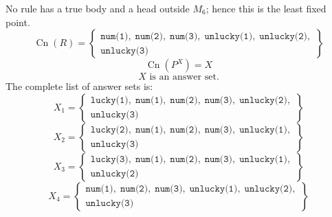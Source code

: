\documentclass[a4paper,11pt]{article}
\newif\ifexplain
\newcommand{\explain}[1]{\ifexplain\begin{erklbox}#1\end{erklbox}\fi}
\newcommand{\at}[1]{\texttt{#1}}
\begin{document}
\explain{Für $\at{unlucky(3)}$ brauchen wir $\at{num(3)}$. Weil diese Voraussetzungen bereits hergeleitet sind, dürfen wir den Regelkopf jetzt aufnehmen und alle bisherigen Atome behalten; bei einer fehlenden Voraussetzung würde diese Regel dagegen noch nichts beitragen.}
No rule has a true body and a head outside $M_{6}$; hence this is the least fixed point.
\[
\operatorname{Cn}(R)=\left\{\begin{gathered}\at{num(1)},\;\at{num(2)},\;\at{num(3)},\;\at{unlucky(1)},\;\at{unlucky(2)},\\\at{unlucky(3)}\end{gathered}\right\}
\]
\[
\operatorname{Cn}(P^X)=X
\]
\[
\boxed{X\text{ is an answer set.}}
\]
The complete list of answer sets is:
\[
\boxed{X_1=\left\{\begin{gathered}\at{lucky(1)},\;\at{num(1)},\;\at{num(2)},\;\at{num(3)},\;\at{unlucky(2)},\\\at{unlucky(3)}\end{gathered}\right\}}
\]
\[
\boxed{X_2=\left\{\begin{gathered}\at{lucky(2)},\;\at{num(1)},\;\at{num(2)},\;\at{num(3)},\;\at{unlucky(1)},\\\at{unlucky(3)}\end{gathered}\right\}}
\]
\[
\boxed{X_3=\left\{\begin{gathered}\at{lucky(3)},\;\at{num(1)},\;\at{num(2)},\;\at{num(3)},\;\at{unlucky(1)},\\\at{unlucky(2)}\end{gathered}\right\}}
\]
\[
\boxed{X_4=\left\{\begin{gathered}\at{num(1)},\;\at{num(2)},\;\at{num(3)},\;\at{unlucky(1)},\;\at{unlucky(2)},\\\at{unlucky(3)}\end{gathered}\right\}}
\]
\end{document}
